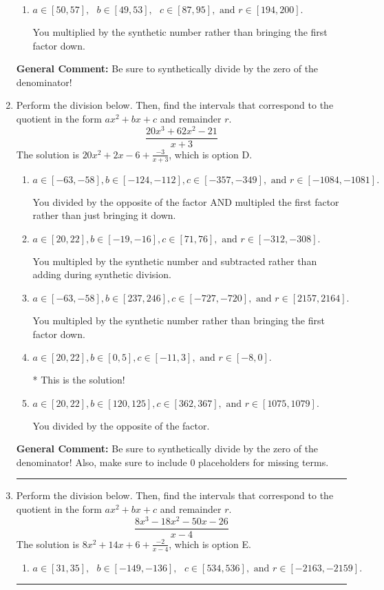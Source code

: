 \documentclass{extbook}[14pt]
\newcommand{\litem}[1]{\item #1

\rule{\textwidth}{0.4pt}}
\begin{document}
\begin{enumerate}
{\begin{enumerate}[label=\Alph*.]
* This is the solution!
\item \( a \in [50, 57], \text{   } b \in [49, 53], \text{   } c \in [87, 95], \text{   and   } r \in [194, 200]. \)

 You multiplied by the synthetic number rather than bringing the first factor down.
\end{enumerate}

\textbf{General Comment:} Be sure to synthetically divide by the zero of the denominator!
}
\litem{
Perform the division below. Then, find the intervals that correspond to the quotient in the form $ax^2+bx+c$ and remainder $r$.
\[ \frac{20x^{3} +62 x^{2} -21}{x + 3} \]The solution is \( 20x^{2} +2 x -6 + \frac{-3}{x + 3} \), which is option D.\begin{enumerate}[label=\Alph*.]
\item \( a \in [-63, -58], b \in [-124, -112], c \in [-357, -349], \text{ and } r \in [-1084, -1081]. \)

 You divided by the opposite of the factor AND multipled the first factor rather than just bringing it down.
\item \( a \in [20, 22], b \in [-19, -16], c \in [71, 76], \text{ and } r \in [-312, -308]. \)

 You multipled by the synthetic number and subtracted rather than adding during synthetic division.
\item \( a \in [-63, -58], b \in [237, 246], c \in [-727, -720], \text{ and } r \in [2157, 2164]. \)

 You multipled by the synthetic number rather than bringing the first factor down.
\item \( a \in [20, 22], b \in [0, 5], c \in [-11, 3], \text{ and } r \in [-8, 0]. \)

* This is the solution!
\item \( a \in [20, 22], b \in [120, 125], c \in [362, 367], \text{ and } r \in [1075, 1079]. \)

 You divided by the opposite of the factor.
\end{enumerate}

\textbf{General Comment:} Be sure to synthetically divide by the zero of the denominator! Also, make sure to include 0 placeholders for missing terms.
}
\litem{
Perform the division below. Then, find the intervals that correspond to the quotient in the form $ax^2+bx+c$ and remainder $r$.
\[ \frac{8x^{3} -18 x^{2} -50 x -26}{x -4} \]The solution is \( 8x^{2} +14 x + 6 + \frac{-2}{x -4} \), which is option E.\begin{enumerate}[label=\Alph*.]
\item \( a \in [31, 35], \text{   } b \in [-149, -136], \text{   } c \in [534, 536], \text{   and   } r \in [-2163, -2159]. \)


\end{enumerate}}
\end{enumerate}
\end{document}
